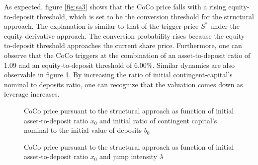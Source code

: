 As expected, figure \ref{fig:sa3} shows that the CoCo price falls with a rising equity-to-deposit threshold, which is set to be the conversion threshold for the structural approach. The explanation is similar to that of the trigger price $S^*$ under the equity  derivative approach. The conversion probability rises because the equity-to-deposit threshold approaches the current share price. Furthermore, one can observe that the CoCo triggers at the combination of an asset-to-deposit ratio of 1.09 and an equity-to-deposit threshold of 6.00\%. Similar dynamics are also observable in figure \ref{fig:sa5}. By increasing the ratio of initial contingent-capital's nominal to deposits ratio, one can recognize that the valuation comes down as leverage increases.\\ 

\begin{figure}
\centering
    \caption[CoCo price pursuant to the structural approach as function of asset-to-deposit ratio and ratio of contingent capital's nominal to deposits]{CoCo price pursuant to the structural approach as function of initial asset-to-deposit ratio $x_0$ and initial ratio of contingent capital's nominal to the initial value of deposits $b_0$}
  \label{fig:sa5}
  \end{figure}

\begin{figure}
\centering
    \caption[CoCo price pursuant to the structural approach as function of asset-to-deposit ratio and jump intensity]{CoCo price pursuant to the structural approach as function of initial asset-to-deposit ratio $x_0$ and jump intensity $\lambda$}
  \label{fig:sa4}
  \end{figure}
  
